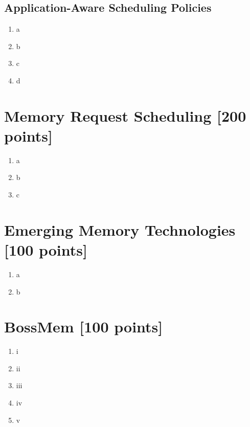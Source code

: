 \documentclass[a4paper]{article}
\begin{document}
\subsection{Application-Aware Scheduling Policies}

\begin{enumerate}[label=\alph*)]
    \item a
    \item b
    \item c
    \item d
\end{enumerate}

\section{Memory Request Scheduling [200 points]}

\begin{enumerate}[label=\alph*)]
    \item a
    \item b
    \item c
\end{enumerate}

\section{Emerging Memory Technologies [100 points]}

\begin{enumerate}[label=\alph*)]
    \item a
    \item b
\end{enumerate}

\section{BossMem [100 points]}

\begin{enumerate}[label=\roman*)]
    \item i
    \item ii
    \item iii
    \item iv
    \item v
\end{enumerate}
\end{document}
